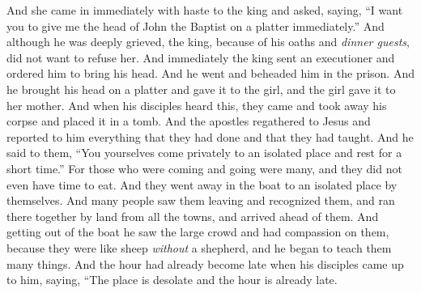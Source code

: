 \begin{biblechapter}
\verse And she came in immediately with haste to the king and asked, saying, “I want you to give me the head of John the Baptist on a platter immediately.”
\verse And although he was deeply grieved, the king, because of his oaths and \textit{dinner guests}, did not want to refuse her.
\verse And immediately the king sent an executioner and ordered him to bring his head. And he went and beheaded him in the prison.
\verse And he brought his head on a platter and gave it to the girl, and the girl gave it to her mother.
\verse And when his disciples heard this, they came and took away his corpse and placed it in a tomb.
 And the apostles regathered to Jesus and reported to him everything that they had done and that they had taught.
\verse And he said to them, “You yourselves come privately to an isolated place and rest for a short time.” For those who were coming and going were many, and they did not even have time to eat.
\verse And they went away in the boat to an isolated place by themselves.
\verse And many people saw them leaving and recognized them, and ran there together by land from all the towns, and arrived ahead of them.
\verse And getting out of the boat he saw the large crowd and had compassion on them, because they were like sheep \textit{without} a shepherd, and he began to teach them many things.
\verse And the hour had already become late when his disciples came up to him, saying, “The place is desolate and the hour is already late.

\end{biblechapter}
